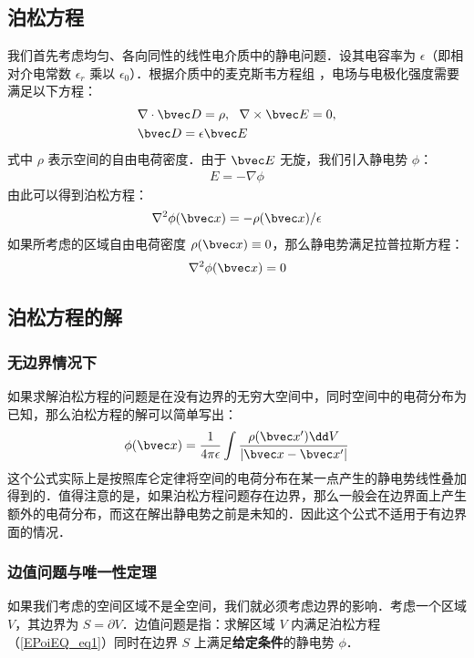 

\subsection{泊松方程}
我们首先考虑均匀、各向同性的线性电介质中的静电问题．设其电容率为 $\epsilon$（即相对介电常数 $\epsilon_r$ 乘以 $\epsilon_0$）．根据介质中的麦克斯韦方程组 ，电场与电极化强度需要满足以下方程：
\begin{align}
&\nabla \cdot \bvec D=\rho,\ \ \nabla \times \bvec E=0,\\
&\bvec D=\epsilon \bvec E
\end{align}
式中 $\rho$ 表示空间的自由电荷密度．由于 $\bvec E$ 无旋，我们引入静电势 $\phi$：
\begin{align}
E=-\nabla \phi
\end{align}
由此可以得到泊松方程：
\begin{align}
\nabla^2 \phi(\bvec x)=-\rho(\bvec x)/\epsilon \label{EPoiEQ_eq1}
\end{align}
如果所考虑的区域自由电荷密度 $\rho(\bvec x)\equiv 0$，那么静电势满足拉普拉斯方程：
\begin{align}
\nabla^2 \phi(\bvec x)=0
\end{align}

\subsection{泊松方程的解}
\subsubsection{无边界情况下}
如果求解泊松方程的问题是在没有边界的无穷大空间中，同时空间中的电荷分布为已知，那么泊松方程的解可以简单写出：
\begin{align}
\phi(\bvec x)=\frac{1}{4\pi \epsilon}\int \frac{\rho (\bvec x')\dd V}{|\bvec x-\bvec x'|}
\end{align}
这个公式实际上是按照库仑定律将空间的电荷分布在某一点产生的静电势线性叠加得到的．值得注意的是，如果泊松方程问题存在边界，那么一般会在边界面上产生额外的电荷分布，而这在解出静电势之前是未知的．因此这个公式不适用于有边界面的情况．
\subsubsection{边值问题与唯一性定理}
如果我们考虑的空间区域不是全空间，我们就必须考虑边界的影响．考虑一个区域 $V$，其边界为 $S=\partial V$．边值问题是指：求解区域 $V$ 内满足泊松方程（\autoref{EPoiEQ_eq1}）同时在边界 $S$ 上满足\textbf{给定条件}的静电势 $\phi$．

